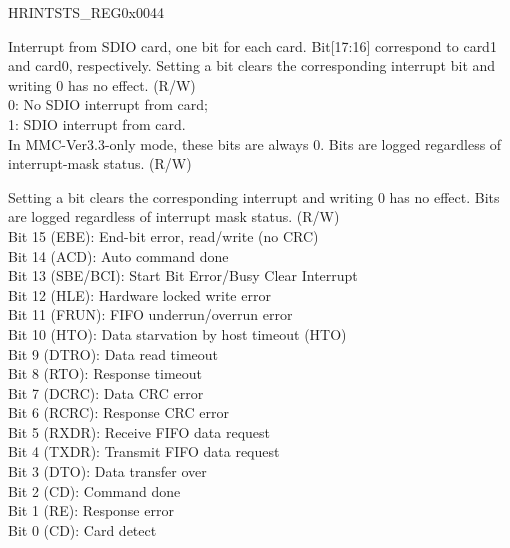 \begin{register}{H}{RINTSTS\_REG}{0x0044}\label{regdesc:RINTSTSREG}
%
%
%
\regnewline%
\begin{regdesc}\begin{reglist}
\item [SDIO\_INTERRUPT\_RAW]Interrupt from SDIO card, one bit for each card. Bit[17:16] correspond to card1 and card0, respectively. Setting a bit clears the corresponding interrupt bit and writing 0 has no effect. (R/W)\\
0: No SDIO interrupt from card;\\
1: SDIO interrupt from card.\\
In MMC-Ver3.3-only mode, these bits are always 0. Bits are logged regardless of interrupt-mask status. (R/W)
\item [INT\_STATUS\_RAW]Setting a bit clears the corresponding interrupt and writing 0 has no effect. Bits are logged regardless of interrupt mask status. (R/W)\\
Bit 15 (EBE): End-bit error, read/write (no CRC)\\
Bit 14 (ACD): Auto command done\\
Bit 13 (SBE/BCI): Start Bit Error/Busy Clear Interrupt\\
Bit 12 (HLE): Hardware locked write error \\
Bit 11 (FRUN): FIFO underrun/overrun error\\
Bit 10 (HTO): Data starvation by host timeout (HTO)\\
Bit 9 (DTRO): Data read timeout \\
Bit 8 (RTO): Response timeout \\
Bit 7 (DCRC): Data CRC error \\
Bit 6 (RCRC): Response CRC error \\
Bit 5 (RXDR): Receive FIFO data request \\
Bit 4 (TXDR): Transmit FIFO data request\\
Bit 3 (DTO): Data transfer over \\
Bit 2 (CD): Command done \\
Bit 1 (RE): Response error\\
Bit 0 (CD): Card detect\\
\end{reglist}\end{regdesc}
\end{register}


